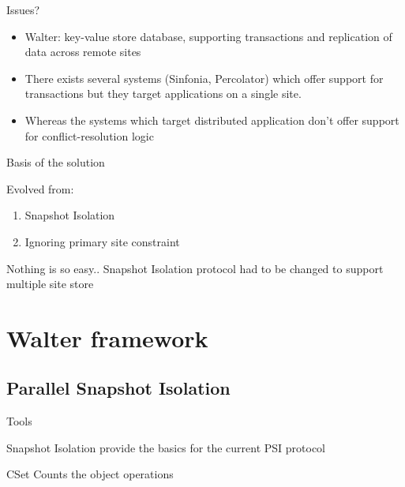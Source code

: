 \documentclass{beamer}
\begin{document}
		\begin{frame}{Issues?}
		
		\begin{itemize}
		\item Walter: key-value store database, supporting transactions and replication of data across remote sites
		\item There exists several systems (Sinfonia, Percolator) which offer support for transactions but they target applications on a single site. 
		\item Whereas the systems which target distributed application don't offer support for conflict-resolution logic
		\end{itemize}
		
		\end{frame}		
	
		\begin{frame}{Basis of the solution}

			Evolved from:
			\begin{enumerate}
			\item Snapshot Isolation
			\item Ignoring primary site constraint
			\end{enumerate}

			\begin{alertblock}{Nothing is so easy..}
				Snapshot Isolation protocol had to be changed to support multiple site store
			\end{alertblock}
						
		\end{frame}		

\section{Walter framework}

	\subsection{Parallel Snapshot Isolation}
		\begin{frame}{Tools}
		
		
			Snapshot Isolation provide the basics for the current PSI protocol
			
			CSet Counts the object operations
		
		\end{frame}
		
\end{document}
